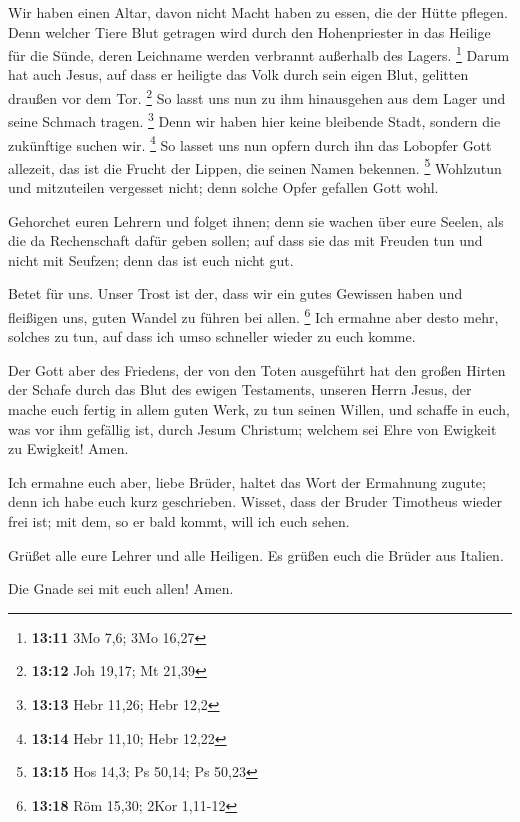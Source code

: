  Wir haben einen Altar, davon nicht Macht haben zu essen,
die der Hütte pflegen.  Denn welcher Tiere Blut getragen
wird durch den Hohenpriester in das Heilige für die Sünde, deren
Leichname werden verbrannt außerhalb des Lagers. \footnote{\textbf{13:11}
  3Mo 7,6; 3Mo 16,27}  Darum hat auch Jesus, auf dass er
heiligte das Volk durch sein eigen Blut, gelitten draußen vor dem Tor.
\footnote{\textbf{13:12} Joh 19,17; Mt 21,39}  So lasst
uns nun zu ihm hinausgehen aus dem Lager und seine Schmach tragen.
\footnote{\textbf{13:13} Hebr 11,26; Hebr 12,2}  Denn wir
haben hier keine bleibende Stadt, sondern die zukünftige suchen wir.
\footnote{\textbf{13:14} Hebr 11,10; Hebr 12,22}  So
lasset uns nun opfern durch ihn das Lobopfer Gott allezeit, das ist die
Frucht der Lippen, die seinen Namen bekennen. \footnote{\textbf{13:15}
  Hos 14,3; Ps 50,14; Ps 50,23}  Wohlzutun und
mitzuteilen vergesset nicht; denn solche Opfer gefallen Gott wohl.

 Gehorchet euren Lehrern und folget ihnen; denn sie
wachen über eure Seelen, als die da Rechenschaft dafür geben sollen; auf
dass sie das mit Freuden tun und nicht mit Seufzen; denn das ist euch
nicht gut.

 Betet für uns. Unser Trost ist der, dass wir ein gutes
Gewissen haben und fleißigen uns, guten Wandel zu führen bei allen.
\footnote{\textbf{13:18} Röm 15,30; 2Kor 1,11-12}  Ich
ermahne aber desto mehr, solches zu tun, auf dass ich umso schneller
wieder zu euch komme.

 Der Gott aber des Friedens, der von den Toten ausgeführt
hat den großen Hirten der Schafe durch das Blut des ewigen Testaments,
unseren Herrn Jesus,  der mache euch fertig in allem
guten Werk, zu tun seinen Willen, und schaffe in euch, was vor ihm
gefällig ist, durch Jesum Christum; welchem sei Ehre von Ewigkeit zu
Ewigkeit! Amen.

 Ich ermahne euch aber, liebe Brüder, haltet das Wort der
Ermahnung zugute; denn ich habe euch kurz geschrieben. 
Wisset, dass der Bruder Timotheus wieder frei ist; mit dem, so er bald
kommt, will ich euch sehen.

 Grüßet alle eure Lehrer und alle Heiligen. Es grüßen
euch die Brüder aus Italien.

 Die Gnade sei mit euch allen! Amen.
